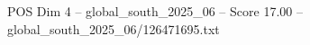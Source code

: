 \begin{textsample}{POS Dim 4 – global\_south\_2025\_06 – Score 17.00 – global\_south\_2025\_06/126471695.txt}
\end{textsample}
